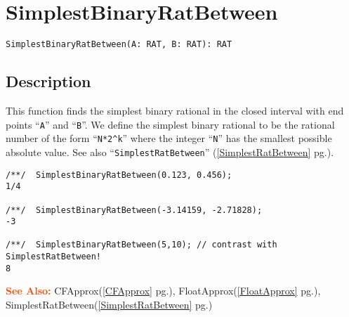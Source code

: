 \documentclass[a4paper]{mybook}
\newenvironment{command}{}{} %
\newcommand\SeeAlso{\par\textcolor{OrangeRed}{\textbf{\large See Also: }}}
\begin{document}
\section{SimplestBinaryRatBetween}
\label{SimplestBinaryRatBetween}
\begin{command} %


\begin{Verbatim}[label=syntax, rulecolor=\color{MidnightBlue},
frame=single]
SimplestBinaryRatBetween(A: RAT, B: RAT): RAT
\end{Verbatim}


\subsection*{Description}

This function finds the simplest binary rational in the closed interval
with end points ``\verb&A&'' and ``\verb&B&''.  We define the simplest binary rational
to be the rational number of the form ``\verb&N*2^k&'' where the integer ``\verb&N&'' has
the smallest possible absolute value.  See also ``\verb&SimplestRatBetween&'' (\ref{SimplestRatBetween} pg.\pageref{SimplestRatBetween}).
\begin{Verbatim}[label=example, rulecolor=\color{PineGreen}, frame=single]
/**/  SimplestBinaryRatBetween(0.123, 0.456);
1/4

/**/  SimplestBinaryRatBetween(-3.14159, -2.71828);
-3

/**/  SimplestBinaryRatBetween(5,10); // contrast with SimplestRatBetween!
8
\end{Verbatim}


\SeeAlso %
  CFApprox(\ref{CFApprox} pg.\pageref{CFApprox}), 
    FloatApprox(\ref{FloatApprox} pg.\pageref{FloatApprox}), 
    SimplestRatBetween(\ref{SimplestRatBetween} pg.\pageref{SimplestRatBetween})
\end{command} %
\end{document}
